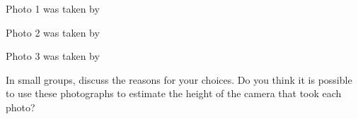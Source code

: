 \documentclass{ximera}
\begin{document}
\begin{exploration}
Photo 1 was taken by 
\begin{multipleChoice}
\end{multipleChoice}

Photo 2 was taken by 
\begin{multipleChoice}
\end{multipleChoice}

Photo 3 was taken by 
\begin{multipleChoice}
\end{multipleChoice}

In small groups, discuss the reasons for your choices.  Do you think it is possible to use these photographs to estimate the height of the camera that took each photo?
\end{exploration}
\end{document}
